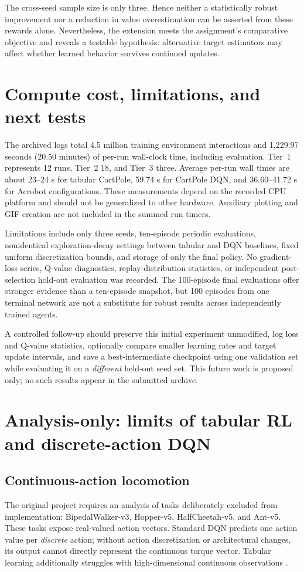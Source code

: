 \documentclass[a4paper,10pt,twocolumn]{article}
\begin{document}
The cross-seed sample size is only three. Hence neither a statistically robust improvement nor a reduction in value overestimation can be asserted from these rewards alone. Nevertheless, the extension meets the assignment's comparative objective and reveals a testable hypothesis: alternative target estimators may affect whether learned behavior survives continued updates.

\section{Compute cost, limitations, and next tests}
The archived logs total 4.5 million training environment interactions and 1,229.97 seconds (20.50 minutes) of per-run wall-clock time, including evaluation. Tier~1 represents 12 runs, Tier~2 18, and Tier~3 three. Average per-run wall times are about 23--24 s for tabular CartPole, 59.74 s for CartPole DQN, and 36.60--41.72 s for Acrobot configurations. These measurements depend on the recorded CPU platform and should not be generalized to other hardware. Auxiliary plotting and GIF creation are not included in the summed run timers.

Limitations include only three seeds, ten-episode periodic evaluations, nonidentical exploration-decay settings between tabular and DQN baselines, fixed uniform discretization bounds, and storage of only the final policy. No gradient-loss series, Q-value diagnostics, replay-distribution statistics, or independent post-selection hold-out evaluation was recorded. The 100-episode final evaluations offer stronger evidence than a ten-episode snapshot, but 100 episodes from one terminal network are not a substitute for robust results across independently trained agents.

A controlled follow-up should preserve this initial experiment unmodified, log loss and Q-value statistics, optionally compare smaller learning rates and target update intervals, and save a best-intermediate checkpoint using one validation set while evaluating it on a \emph{different} held-out seed set. This future work is proposed only; no such results appear in the submitted archive.

\section{Analysis-only: limits of tabular RL and discrete-action DQN}
\subsection{Continuous-action locomotion}
The original project requires an analysis of tasks deliberately excluded from implementation: BipedalWalker-v3, Hopper-v5, HalfCheetah-v5, and Ant-v5. These tasks expose real-valued action vectors. Standard DQN predicts one action value per \emph{discrete} action; without action discretization or architectural changes, its output cannot directly represent the continuous torque vector. Tabular learning additionally struggles with high-dimensional continuous observations \cite{bipedaldocs,hopperdocs,halfdocs,antdocs}.
\end{document}
